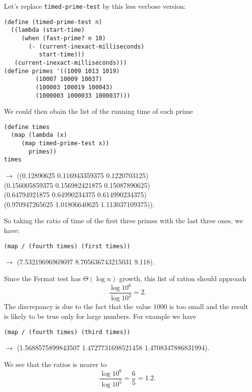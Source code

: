 \documentclass[a4paper,12pt]{article}
\begin{document}
\noindent
Let's replace \lstinline!timed-prime-test! by this less verbose
version:
\begin{lstlisting}
(define (timed-prime-test n)
  ((lambda (start-time)
     (when (fast-prime? n 10)
	   (- (current-inexact-milliseconds)
	      start-time)))
   (current-inexact-milliseconds)))
(define primes '((1009 1013 1019)
		 (10007 10009 10037)
		 (100003 100019 100043)
		 (1000003 1000033 1000037)))
\end{lstlisting}
We could then obain the list of the running time of each prime
\begin{lstlisting}
(define times
  (map (lambda (x)
	 (map timed-prime-test x))
       primes))
times
\end{lstlisting}
$\rightarrow$ 
((0.12890625
 0.116943359375
 0.1220703125) \\
 (0.156005859375
 0.156982421875
 0.15087890625) \\
 (0.64794921875
 0.64990234375 
 0.614990234375) \\
 (0.970947265625 
 1.01806640625
 1.113037109375)).

So taking the ratio of time of the first three primes with the last three
ones, we have:
\begin{lstlisting}
(map / (fourth times) (first times))
\end{lstlisting}
$\rightarrow$ (7.53219696969697 8.705636743215031 9.118).

Since the Fermat test has $\Theta(\log n)$ growth, this list of ration
should approach
\[ \frac{\log 10^6}{\log 10^3} = 2.\]
The discrepancy is due to the fact that the value $1000$ is too small
and the result is likely to be true only for large numbers.  For
example we have
\begin{lstlisting}
(map / (fourth times) (third times))
\end{lstlisting}
$\rightarrow$ (1.5688575899843507 1.4727731698521458
1.4708347886831994).

We see that the ratios is nearer to
\[ \frac{\log 10^6}{\log 10^5} = \frac{6}{5} = 1.2.\]
\end{document}
